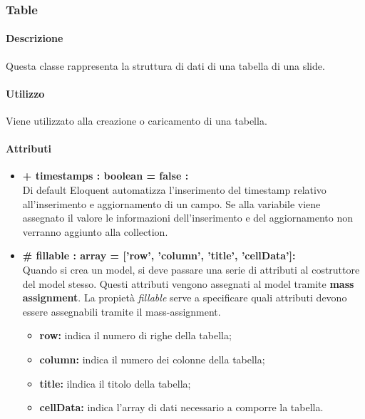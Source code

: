 \subsubsection{Table}


	\paragraph{Descrizione}
	Questa classe rappresenta la struttura di dati di una tabella di una slide.
	
	\paragraph{Utilizzo}
	Viene utilizzato alla creazione o caricamento di una tabella.
	
	\paragraph{Attributi}
	\begin{itemize}
		\item \textbf{+ timestamps : boolean = false :}\\
		Di default Eloquent automatizza l'inserimento del timestamp relativo all'inserimento e aggiornamento di un campo. Se alla variabile viene assegnato il valore le informazioni dell'inserimento e del aggiornamento non verranno aggiunto alla collection.
		\item \textbf{\# fillable : array = [’row’, ’column’, ’title’, ’cellData’]:}\\
		Quando si crea un model, si deve passare una serie di attributi al costruttore del model stesso. Questi attributi vengono assegnati al model tramite \textbf{mass assignment}. La propietà \textit{fillable} serve a specificare quali attributi devono essere assegnabili tramite il mass-assignment.
		\begin{itemize}
			\item \textbf{row:} indica il numero di righe della tabella;
			\item \textbf{column:} indica il numero dei colonne della tabella;
			\item \textbf{title:} ilndica il titolo della tabella;
			\item \textbf{cellData:} indica l'array di dati necessario a comporre la tabella.
		\end{itemize}
	\end{itemize}